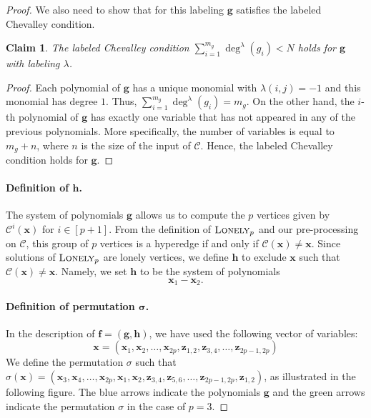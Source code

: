 \documentclass[10pt,a4paper]{article}
\newtheorem{claim}[theorem]{Claim}
\theoremstyle{definition}
\theoremstyle{remark}
\newcommand{\calC}{\mathcal{C}}
\newcommand{\vecf}{\ensuremath{\boldsymbol{f}}}
\newcommand{\vecg}{\ensuremath{\boldsymbol{g}}}
\newcommand{\vech}{\ensuremath{\boldsymbol{h}}}
\newcommand{\vecx}{\ensuremath{\boldsymbol{x}}}
\newcommand{\vecz}{\ensuremath{\boldsymbol{z}}}
\newcommand{\pnum}{p}
\newcommand{\lonelyp}{\ensuremath\textsc{Lonely}_{\pnum}}
\providecommand{\bracks}[1]{\left[#1\right]}
\begin{document}
\begin{proof}
        We also need to show that for this labeling $\vecg$ satisfies the labeled
        Chevalley condition.
        \begin{claim}
          \label{cl:ChevalleyForf1}
          The labeled Chevalley condition
          $\sum_{i = 1}^{m_g} \deg^{\lambda}(g_i) < N$ holds for $\vecg$ with
          labeling $\lambda$.
        \end{claim}
        \begin{proof}              Each polynomial of $\vecg$ has a unique monomial with $\lambda(i,j) = -1$
              and this monomial has degree $1$. Thus,
              $\sum_{i = 1}^{m_g} \deg^{\lambda}(g_{i}) = m_g$.
              On the other hand, the $i$-th polynomial of $\vecg$ has exactly one
              variable that has not appeared in any of the previous polynomials. More
              specifically, the number of variables is equal to $m_g + n$, where $n$
              is the size of the input of $\calC$. Hence, the labeled Chevalley
              condition holds for $\vecg$.
        \end{proof}

        \paragraph{Definition of $\vech$.} The system of polynomials $\vecg$ allows
        us to compute the $p$ vertices given by ${\calC}^{i}(\vecx)$ for
        $i \in \bracks{p+1}$. From the definition of $\lonelyp$ and our pre-processing on
        $\calC$, this group of $p$ vertices is a hyperedge if and only if
        $\calC(\vecx) \neq \vecx$. Since solutions of $\lonelyp$ are lonely
        vertices, we define $\vech$ to exclude $\vecx$ such that
        $\calC(\vecx) \neq \vecx$. Namely, we set $\vech$ to be the system of
        polynomials
                          \[ \vecx_1 - \vecx_2.\]

        \paragraph{Definition of permutation $\boldsymbol{\sigma}$.} In the description
        of $\vecf = (\vecg, \vech)$, we have used the following vector of variables:
                    \[  \vecx = (\vecx_1, \vecx_2, \dots, \vecx_{2p},
                          \vecz_{1,2}, \vecz_{3,4}, \dots, \vecz_{2p-1,2p} )
                    \]
      	We define the permutation $\sigma$ such that $\sigma(\vecx) = (\vecx_3, \vecx_4, \dots, \vecx_{2p},
                \vecx_1, \vecx_2, \vecz_{3,4}, \vecz_{5,6}, \dots, \vecz_{2p-1,2p},
                \vecz_{1,2})$, as illustrated in the following figure. The \textcolor{Gblue}{blue} arrows indicate the polynomials $\vecg$ and the \textcolor{Ggreen}{green} arrows indicate the permutation $\sigma$ in the case of $p=3$.


\end{proof}
\end{document}
